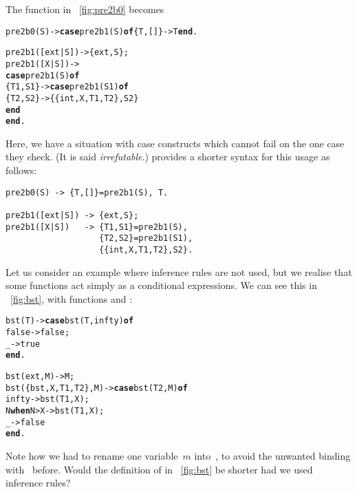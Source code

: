 The function in \fig~\vref{fig:pre2b0} becomes
\begin{alltt}
pre2b0(S) -> \textbf{case} pre2b1(S) \textbf{of} \{T,[]\} -> T \textbf{end}.

pre2b1([ext|S]) -> \{ext,S\};
pre2b1([X|S])   ->
  \textbf{case} pre2b1(S) \textbf{of}
    \{T1,S1\} -> \textbf{case} pre2b1(S1) \textbf{of}
                 \{T2,S2\} -> \{\{int,X,T1,T2\},S2\}
               \textbf{end}
  \textbf{end}.
\end{alltt}
Here, we have a situation with case constructs which cannot fail on
the one case they check. (It is said \emph{irrefutable}.) \Erlang
provides a shorter syntax for this usage as follows:
\begin{verbatim}
pre2b0(S) -> {T,[]}=pre2b1(S), T.

pre2b1([ext|S]) -> {ext,S};
pre2b1([X|S])   -> {T1,S1}=pre2b1(S),
                   {T2,S2}=pre2b1(S1),
                   {{int,X,T1,T2},S2}.
\end{verbatim}
Let us consider an example where inference rules are not used, but we
realise that some functions act simply as a conditional expressions. We
can see this in \fig~\vref{fig:bst}, with functions  and
:
\begin{alltt}
bst(T) -> \textbf{case} bst(T,infty) \textbf{of}
            false -> false;
            \_    -> true
          \textbf{end}.

bst(ext,M)           -> M;
bst(\{bst,X,T1,T2\},M) -> \textbf{case} bst(T2,M) \textbf{of}
                                 infty -> bst(T1,X);
                          N \textbf{when} N > X -> bst(T1,X);
                                     \_ -> false
                        \textbf{end}.
\end{alltt}
Note how we had to rename one variable~\(m\) into~, to
avoid the unwanted binding with~ before. Would the
definition of  in \fig~\ref{fig:bst} be shorter had we used
inference rules?


